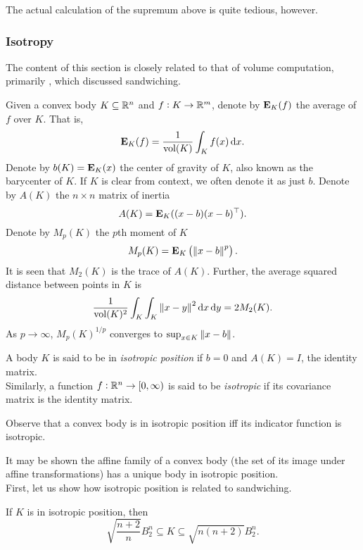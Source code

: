 		The actual calculation of the supremum above is quite tedious, however.


	\subsubsection{Isotropy}

		The content of this section is closely related to that of volume computation, primarily , which discussed sandwiching.

		Given a convex body $K\subseteq\mathbb{R}^n$ and $f:K\to\mathbb{R}^m$, denote by $\textbf{E}_K(f)$ the average of $f$ over $K$. That is,
		\[ \textbf{E}_K(f) = \frac{1}{\operatorname{vol}(K)} \int_{K} f(x)\operatorname{d}\!{x}. \]
		Denote by $b(K)=\textbf{E}_K(x)$ the center of gravity of $K$, also known as the barycenter of $K$. If $K$ is clear from context, we often denote it as just $b$. Denote by $A(K)$ the $n\times n$ matrix of inertia
		\[ A(K) = \textbf{E}_K((x-b)(x-b)^\top). \]
		Denote by $M_p(K)$ the $p$th moment of $K$
		\[ M_p(K) = \textbf{E}_K\left(\left\lVert x-b\right\rVert^p\right). \]
		It is seen that $M_2(K)$ is the trace of $A(K)$. Further, the average squared distance between points in $K$ is
		\[ \frac{1}{\operatorname{vol}(K)^2} \int_K \int_K \left\lVert x-y\right\rVert^2\operatorname{d}\!{x}\operatorname{d}\!{y} = 2M_2(K). \]
		As $p\to\infty$, $M_p(K)^{1/p}$ converges to $\sup_{x\in K} \left\lVert x-b\right\rVert$.

		\begin{fdef}[Isotropic]
			A body $K$ is said to be in \textit{isotropic position} if $b=0$ and $A(K)=I$, the identity matrix.\footnotemark\\
			Similarly, a function $f:\mathbb{R}^n\to[0,\infty)$ is said to be \textit{isotropic} if its covariance matrix is the identity matrix.
		\end{fdef}

		Observe that a convex body is in isotropic position iff its indicator function is isotropic.

		It may be shown the affine family of a convex body (the set of its image under affine transformations) has a unique body in isotropic position.\\
		First, let us show how isotropic position is related to sandwiching.

		\begin{ftheo}
			If $K$ is in isotropic position, then
			\[ \sqrt{\frac{n+2}{n}} B_2^n \subseteq K \subseteq \sqrt{n(n+2)}B_2^n. \]
		\end{ftheo}

